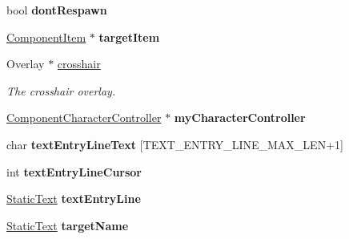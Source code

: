 \begin{DoxyCompactItemize}
\item 
\hypertarget{classComponentPlayer_ad8037048b27ba4693990ced43a5eedb4}{
bool {\bfseries dont\-Respawn}}
\label{d5/d28/classComponentPlayer_ad8037048b27ba4693990ced43a5eedb4}

\item 
\hypertarget{classComponentPlayer_af7c42ef5900e9d62ced3523b7686cf85}{
\hyperlink{classComponentItem}{\-Component\-Item} $\ast$ {\bfseries target\-Item}}
\label{d5/d28/classComponentPlayer_af7c42ef5900e9d62ced3523b7686cf85}

\item 
\hypertarget{classComponentPlayer_a15b6245d4a067a769169a520307ff5a0}{
\-Overlay $\ast$ \hyperlink{classComponentPlayer_a15b6245d4a067a769169a520307ff5a0}{crosshair}}
\label{d5/d28/classComponentPlayer_a15b6245d4a067a769169a520307ff5a0}

\begin{DoxyCompactList}\small\item\em \-The crosshair overlay. \end{DoxyCompactList}\item 
\hypertarget{classComponentPlayer_ac1beab9d4871378b41e2cea69cbd279f}{
\hyperlink{classComponentCharacterController}{\-Component\-Character\-Controller} $\ast$ {\bfseries my\-Character\-Controller}}
\label{d5/d28/classComponentPlayer_ac1beab9d4871378b41e2cea69cbd279f}

\item 
\hypertarget{classComponentPlayer_ac511e7910673fe2bd9ad0a36bcd8324a}{
char {\bfseries text\-Entry\-Line\-Text} \mbox{[}\-T\-E\-X\-T\-\_\-\-E\-N\-T\-R\-Y\-\_\-\-L\-I\-N\-E\-\_\-\-M\-A\-X\-\_\-\-L\-E\-N+1\mbox{]}}
\label{d5/d28/classComponentPlayer_ac511e7910673fe2bd9ad0a36bcd8324a}

\item 
\hypertarget{classComponentPlayer_a2d2e2f99c8b5c3179b31864c452a6c5d}{
int {\bfseries text\-Entry\-Line\-Cursor}}
\label{d5/d28/classComponentPlayer_a2d2e2f99c8b5c3179b31864c452a6c5d}

\item 
\hypertarget{classComponentPlayer_a86eb5c098f810e739c8112a770e31d2a}{
\hyperlink{classStaticText}{\-Static\-Text} {\bfseries text\-Entry\-Line}}
\label{d5/d28/classComponentPlayer_a86eb5c098f810e739c8112a770e31d2a}

\item 
\hypertarget{classComponentPlayer_a10ad75ca2e9273f50ec7ed4257cb1324}{
\hyperlink{classStaticText}{\-Static\-Text} {\bfseries target\-Name}}
\label{d5/d28/classComponentPlayer_a10ad75ca2e9273f50ec7ed4257cb1324}

\end{DoxyCompactItemize}
